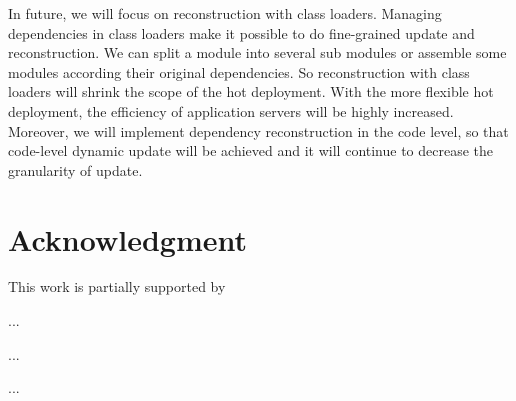 \documentclass[conference]{IEEEtran}
\begin{document}
In future, we will focus on reconstruction with class loaders.
Managing dependencies in class loaders make it possible to do fine-grained update and reconstruction.
We can split a module into several sub modules or assemble some modules according their original dependencies.
So reconstruction with class loaders will shrink the scope of the hot deployment.
With the more flexible hot deployment, the efficiency of application servers will be highly increased.
Moreover, we will implement dependency reconstruction in the code level\cite{future_Gu}, so that code-level dynamic update will be achieved and it will continue to decrease the granularity of update.

\section*{Acknowledgment}
This work is partially supported by

...

...

...
\end{document}

